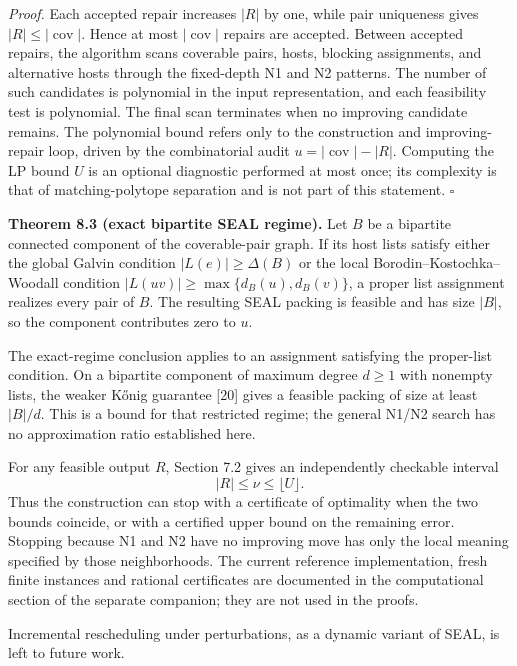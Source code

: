 \documentclass[english,11pt,a4paper]{article}
\newcounter{none}
\begin{document}
\emph{Proof.} Each accepted repair increases \(|R|\) by one, while pair
uniqueness gives \(|R|\le |\operatorname{cov}|\). Hence at most
\(|\operatorname{cov}|\) repairs are accepted. Between accepted repairs,
the algorithm scans coverable pairs, hosts, blocking assignments, and
alternative hosts through the fixed-depth N1 and N2 patterns. The number
of such candidates is polynomial in the input representation, and each
feasibility test is polynomial. The final scan terminates when no
improving candidate remains. The polynomial bound refers only to the
construction and improving-repair loop, driven by the combinatorial
audit \(u=\lvert\operatorname{cov}\rvert-\lvert R\rvert\). Computing the
LP bound \(U\) is an optional diagnostic performed at most once; its
complexity is that of matching-polytope separation and is not part of
this statement. \(\square\)

\textbf{Theorem 8.3 (exact bipartite SEAL regime).} Let \(B\) be a
bipartite connected component of the coverable-pair graph. If its host
lists satisfy either the global Galvin condition
\(\lvert L(e)\rvert\ge\Delta(B)\) or the local
Borodin--Kostochka--Woodall condition
\(\lvert L(uv)\rvert\ge\max\{d_B(u),d_B(v)\}\), a proper list assignment
realizes every pair of \(B\). The resulting SEAL packing is feasible and
has size \(\lvert B\rvert\), so the component contributes zero to \(u\).

The exact-regime conclusion applies to an assignment satisfying the
proper-list condition. On a bipartite component of maximum degree
\(d\ge1\) with nonempty lists, the weaker Kőnig guarantee {[}20{]} gives
a feasible packing of size at least \(\lvert B\rvert/d\). This is a
bound for that restricted regime; the general N1/N2 search has no
approximation ratio established here.

For any feasible output \(R\), Section 7.2 gives an independently
checkable interval \[
|R|\le\nu\le\lfloor U\rfloor.
\] Thus the construction can stop with a certificate of optimality when
the two bounds coincide, or with a certified upper bound on the
remaining error. Stopping because N1 and N2 have no improving move has
only the local meaning specified by those neighborhoods. The current
reference implementation, fresh finite instances and rational
certificates are documented in the computational section of the separate
companion; they are not used in the proofs.

Incremental rescheduling under perturbations, as a dynamic variant of
SEAL, is left to future work.
\end{document}
